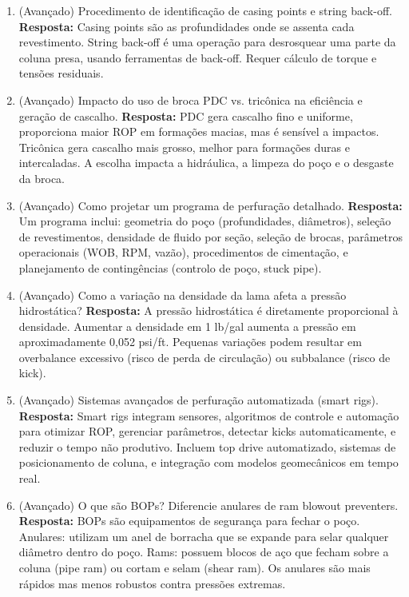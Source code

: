 \documentclass[11pt,a4paper]{article}
\begin{document}
\begin{enumerate}
  \item (Avançado) Procedimento de identificação de casing points e string back-off.
  \textbf{Resposta:} Casing points são as profundidades onde se assenta cada revestimento. String back-off é uma operação para desrosquear uma parte da coluna presa, usando ferramentas de back-off. Requer cálculo de torque e tensões residuais.

  \item (Avançado) Impacto do uso de broca PDC vs. tricônica na eficiência e geração de cascalho.
  \textbf{Resposta:} PDC gera cascalho fino e uniforme, proporciona maior ROP em formações macias, mas é sensível a impactos. Tricônica gera cascalho mais grosso, melhor para formações duras e intercaladas. A escolha impacta a hidráulica, a limpeza do poço e o desgaste da broca.

  \item (Avançado) Como projetar um programa de perfuração detalhado.
  \textbf{Resposta:} Um programa inclui: geometria do poço (profundidades, diâmetros), seleção de revestimentos, densidade de fluido por seção, seleção de brocas, parâmetros operacionais (WOB, RPM, vazão), procedimentos de cimentação, e planejamento de contingências (controlo de poço, stuck pipe).

  \item (Avançado) Como a variação na densidade da lama afeta a pressão hidrostática?
  \textbf{Resposta:} A pressão hidrostática é diretamente proporcional à densidade. Aumentar a densidade em 1 lb/gal aumenta a pressão em aproximadamente 0,052 psi/ft. Pequenas variações podem resultar em overbalance excessivo (risco de perda de circulação) ou subbalance (risco de kick).

  \item (Avançado) Sistemas avançados de perfuração automatizada (smart rigs).
  \textbf{Resposta:} Smart rigs integram sensores, algoritmos de controle e automação para otimizar ROP, gerenciar parâmetros, detectar kicks automaticamente, e reduzir o tempo não produtivo. Incluem top drive automatizado, sistemas de posicionamento de coluna, e integração com modelos geomecânicos em tempo real.

  \item (Avançado) O que são BOPs? Diferencie anulares de ram blowout preventers.
  \textbf{Resposta:} BOPs são equipamentos de segurança para fechar o poço. Anulares: utilizam um anel de borracha que se expande para selar qualquer diâmetro dentro do poço. Rams: possuem blocos de aço que fecham sobre a coluna (pipe ram) ou cortam e selam (shear ram). Os anulares são mais rápidos mas menos robustos contra pressões extremas.


\end{enumerate}
\end{document}

